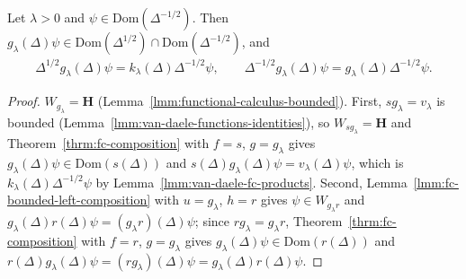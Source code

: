 \begin{lemma}
    \label{lmm:van-daele-g-domains}
    \leanok
    Let $\lambda > 0$ and $\psi \in \text{Dom}(\Delta^{-1/2})$. Then $g_\lambda(\Delta)\psi \in \text{Dom}(\Delta^{1/2}) \cap \text{Dom}(\Delta^{-1/2})$, and
    \begin{align}
        \Delta^{1/2}g_\lambda(\Delta)\psi = k_\lambda(\Delta)\Delta^{-1/2}\psi, \qquad \Delta^{-1/2}g_\lambda(\Delta)\psi = g_\lambda(\Delta)\Delta^{-1/2}\psi.
    \end{align}
\end{lemma}
\begin{proof}
    \leanok
    $W_{g_\lambda} = \mathbf{H}$ (Lemma~\ref{lmm:functional-calculus-bounded}). First, $sg_\lambda = v_\lambda$ is bounded (Lemma~\ref{lmm:van-daele-functions-identities}), so $W_{sg_\lambda} = \mathbf{H}$ and Theorem~\ref{thrm:fc-composition} with $f = s$, $g = g_\lambda$ gives $g_\lambda(\Delta)\psi \in \text{Dom}(s(\Delta))$ and $s(\Delta)g_\lambda(\Delta)\psi = v_\lambda(\Delta)\psi$, which is $k_\lambda(\Delta)\Delta^{-1/2}\psi$ by Lemma~\ref{lmm:van-daele-fc-products}. Second, Lemma~\ref{lmm:fc-bounded-left-composition} with $u = g_\lambda$, $h = r$ gives $\psi \in W_{g_\lambda r}$ and $g_\lambda(\Delta)r(\Delta)\psi = (g_\lambda r)(\Delta)\psi$; since $rg_\lambda = g_\lambda r$, Theorem~\ref{thrm:fc-composition} with $f = r$, $g = g_\lambda$ gives $g_\lambda(\Delta)\psi \in \text{Dom}(r(\Delta))$ and $r(\Delta)g_\lambda(\Delta)\psi = (rg_\lambda)(\Delta)\psi = g_\lambda(\Delta)r(\Delta)\psi$.
\end{proof}

